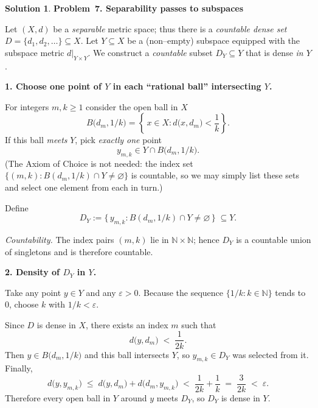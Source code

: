 \documentclass[12pt]{article}
\theoremstyle{definition} %
\newtheorem{solution}{Solution}
\theoremstyle{plain} %
\begin{document}
      \begin{solution}
            \textbf{Problem 7.  Separability passes to subspaces}
            
            \medskip
            Let \((X,d)\) be a \emph{separable} metric space;  
            thus there is a \emph{countable dense set} \(D=\{d_1,d_2,\dots\}\subseteq X\).
            Let \(Y\subseteq X\) be a (non–empty) subspace equipped with the
            subspace metric \(d|_{Y\times Y}\).
            We construct a \emph{countable} subset \(D_Y\subseteq Y\) that is dense
            \emph{in \(Y\)}.
            
            \bigskip
            \textbf{1.  Choose one point of \(Y\) in each ``rational ball'' intersecting \(Y\).}
            
            For integers \(m,k\ge 1\) consider the open ball in \(X\)
            \[
                 B\!\bigl(d_m,1/k\bigr)
                 =\left\{\,x\in X : d\!\bigl(x,d_m\bigr)<\frac{1}{k}\right\}.
            \]
            If this ball \emph{meets} \(Y\), pick \emph{exactly one} point
            \[
                  y_{m,k}\in Y\cap B\!\bigl(d_m,1/k\bigr).
            \]
            (The Axiom of Choice is not needed: the index set \(\{(m,k):B(d_m,1/k)\cap
            Y\neq\varnothing\}\) is countable, so we may simply list these sets and
            select one element from each in turn.)
            
            Define
            \[
                  D_Y := \bigl\{\,y_{m,k} :
                                 B(d_m,1/k)\cap Y\neq\varnothing\,\bigr\}
                  \;\subseteq Y .
            \]
            
            \smallskip
            \emph{Countability.}  
            The index pairs \((m,k)\) lie in \(\mathbb N\times\mathbb N\); hence
            \(D_Y\) is a countable union of singletons and is therefore countable.
            
            \bigskip
            \textbf{2.  Density of \(D_Y\) in \(Y\).}
            
            Take any point \(y\in Y\) and any \(\varepsilon>0\).
            Because the sequence \(\bigl\{1/k:k\in\mathbb N\bigr\}\)
            tends to \(0\), choose \(k\) with \(1/k<\varepsilon\).
            
            Since \(D\) is dense in \(X\), there exists an index \(m\) such that
            \[
                  d\!\bigl(y,d_m\bigr)\;<\;\frac{1}{2k}.
            \]
            Then
            \(y\in B\!\bigl(d_m,1/k\bigr)\) and this ball intersects \(Y\), so
            \(y_{m,k}\in D_Y\) was selected from it.
            Finally,
            \[
                  d\!\bigl(y,y_{m,k}\bigr)
                  \;\le\;
                  d\!\bigl(y,d_m\bigr)+d\!\bigl(d_m,y_{m,k}\bigr)
                  \;<\;
                  \frac{1}{2k}+\frac{1}{k}
                  \;=\;\frac{3}{2k}\;<\;\varepsilon.
            \]
            Therefore every open ball in \(Y\) around \(y\) meets \(D_Y\), so
            \(D_Y\) is dense in \(Y\).
            

\end{solution}
\end{document}
